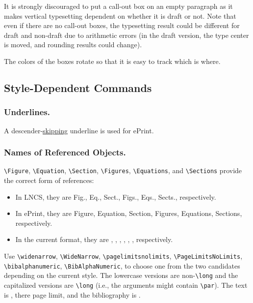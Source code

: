 
It is strongly discouraged to put a call-out box on an empty paragraph
as it makes vertical typesetting dependent on whether it is draft or not.
Note that even if there are no call-out boxes,
the typesetting result could be different for draft and non-draft
due to arithmetic errors
(in the draft version,
the type center is moved, and
rounding results could change).

The colors of the boxes rotate so that it is easy to track which is where.

\subsection{Style-Dependent Commands}

\subsubsection{Underlines.}
A descender-\ul{skipping} underline is used for ePrint.

\subsubsection{Names of Referenced Objects.}
\texttt{\textbackslash Figure},
\texttt{\textbackslash Equation},
\texttt{\textbackslash Section},
\texttt{\textbackslash Figures},
\texttt{\textbackslash Equations}, and
\texttt{\textbackslash Sections}
provide the correct form of references:
\begin{itemize}
\item
In LNCS, they are Fig., Eq., Sect., Figs., Eqs., Sects., respectively.
\item
In ePrint, they are Figure, Equation, Section, Figures, Equations, Sections, respectively.
\item
In the current format, they are
\Figure, \Equation, \Section, \Figures, \Equations, \Sections, respectively.
\end{itemize}
Use \texttt{\textbackslash widenarrow},
\texttt{\textbackslash WideNarrow},
\texttt{\textbackslash pagelimitsnolimits},
\texttt{\textbackslash PageLimitsNoLimits},
\texttt{\textbackslash bibalphanumeric},
\texttt{\textbackslash BibAlphaNumeric},
to choose one from the two candidates depending on the current style.
The lowercase versions are non-\texttt{\textbackslash long} and
the capitalized versions are \texttt{\textbackslash long}
(i.e., the arguments might contain \texttt{\textbackslash par}).
The text is ,
there  page limit,
and the bibliography is .

